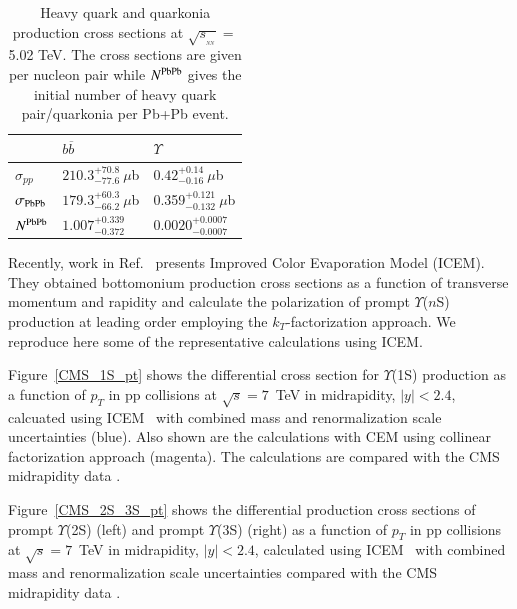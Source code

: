 \begin{table}
  \begin{center}
\caption[]{Heavy quark and quarkonia production  cross sections at
$\sqrt{s_{_{_{NN}}}}=$ 5.02 TeV. The cross sections are given per nucleon pair while
$N^{\rm PbPb}$ gives the initial number of heavy quark pair/quarkonia per Pb+Pb event.}
\label{NLOcros}
\begin{tabular}{l|l|l} 
\hline 
\hline
                        & $ b \overline b$                    & $\Upsilon$   \\              
\hline
$\sigma_{pp}$            & $210.3^{+70.8}_{-77.6}~\mu$b            & $0.42^{+0.14}_{-0.16}~\mu$b  \\


$\sigma_{\rm PbPb}$        & $179.3^{+60.3}_{-66.2}~\mu$b             & 0.359$^{+0.121}_{-0.132}~\mu$b  \\



$N^{\rm PbPb}$              & $1.007^{+0.339}_{-0.372}$               & $0.0020^{+0.0007}_{-0.0007}$   \\

\hline
\hline
\end{tabular}
\end{center}
\end{table}


Recently, work in Ref.~\cite{Cheung:2018upe} presents Improved Color Evaporation Model
(ICEM). They obtained bottomonium production cross sections as a function of
transverse momentum and rapidity and calculate the polarization of prompt
$\varUpsilon$($n$S) production at leading order employing the $k_T$-factorization approach.
We reproduce here some of the representative calculations using ICEM.

Figure~\ref{CMS_1S_pt} shows the
differential cross section for $\varUpsilon$(1S) production as a function
  of $p_T$ in pp collisions at $\sqrt{s} = 7$~TeV in midrapidity, $|y|<2.4$, calcuated using
ICEM~\cite{Cheung:2018upe} with combined mass and renormalization scale
uncertainties (blue).  Also shown are the calculations with CEM using collinear
factorization approach (magenta).
 The calculations are compared with the CMS midrapidity data \cite{Chatrchyan:2013yna}.

Figure~\ref{CMS_2S_3S_pt} shows the
differential production cross sections of prompt $\varUpsilon$(2S) (left)
  and prompt $\varUpsilon$(3S) (right) as a function
  of $p_T$ in pp collisions at $\sqrt{s} = 7$~TeV in midrapidity, $|y|<2.4$, 
  calculated using ICEM~\cite{Cheung:2018upe} with combined mass and renormalization
  scale uncertainties compared with the CMS midrapidity data \cite{Chatrchyan:2013yna}.

